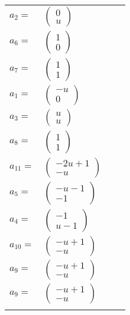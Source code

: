 \documentclass[1p]{elsarticle_modified}
\theoremstyle{definition}
\begin{document}
\begin{tabular}{m{7pt} m{180pt} m{7pt} m{180pt} }
\flushright $a_{2}=$&$\begin{pmatrix}0\\u\end{pmatrix}$ \\
\flushright $a_{6}=$&$\begin{pmatrix}1\\0\end{pmatrix}$ \\
\flushright $a_{7}=$&$\begin{pmatrix}1\\1\end{pmatrix}$ \\
\flushright $a_{1}=$&$\begin{pmatrix}- u\\0\end{pmatrix}$ \\
\flushright $a_{3}=$&$\begin{pmatrix}u\\u\end{pmatrix}$ \\
\flushright $a_{8}=$&$\begin{pmatrix}1\\1\end{pmatrix}$ \\
\flushright $a_{11}=$&$\begin{pmatrix}-2 u+1\\- u\end{pmatrix}$ \\
\flushright $a_{5}=$&$\begin{pmatrix}- u-1\\-1\end{pmatrix}$ \\
\flushright $a_{4}=$&$\begin{pmatrix}-1\\u-1\end{pmatrix}$ \\
\flushright $a_{10}=$&$\begin{pmatrix}- u+1\\- u\end{pmatrix}$ \\
\flushright $a_{9}=$&$\begin{pmatrix}- u+1\\- u\end{pmatrix}$\\ \flushright $a_{9}=$&$\begin{pmatrix}- u+1\\- u\end{pmatrix}$\\&\end{tabular}
\end{document}
